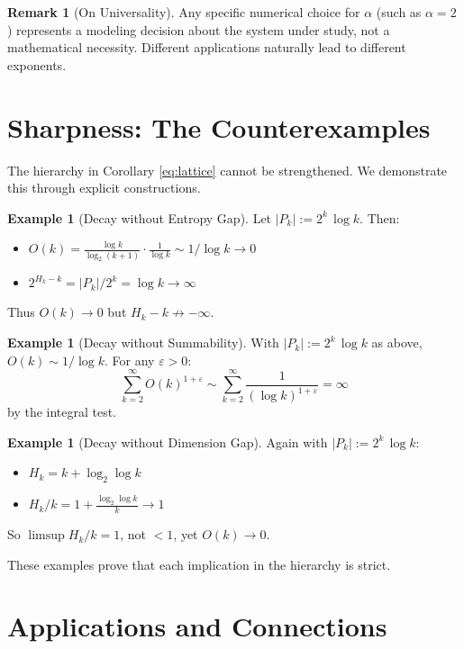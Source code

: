 \documentclass[11pt]{article}
\theoremstyle{definition}
\newtheorem{remark}[theorem]{Remark}
\newtheorem{example}[theorem]{Example}
\begin{document}
\begin{remark}[On Universality]
Any specific numerical choice for $\alpha$ (such as $\alpha=2$) represents a modeling decision about the system under study, not a mathematical necessity. Different applications naturally lead to different exponents.
\end{remark}

\section{Sharpness: The Counterexamples}

The hierarchy in Corollary \ref{eq:lattice} cannot be strengthened. We demonstrate this through explicit constructions.

\begin{example}[Decay without Entropy Gap]\label{ex:no-gap}
Let $|P_k|:=2^k\,\log k$. Then:
\begin{itemize}
\item $O(k)=\frac{\log k}{\log_2(k+1)}\cdot\frac{1}{\log k}\sim 1/\log k\to 0$
\item $2^{H_k-k}=|P_k|/2^k=\log k\to\infty$
\end{itemize}
Thus $O(k)\to 0$ but $H_k-k\not\to-\infty$.
\end{example}

\begin{example}[Decay without Summability]
With $|P_k|:=2^k\,\log k$ as above, $O(k)\sim 1/\log k$. For any $\varepsilon>0$:
$$\sum_{k=2}^{\infty} O(k)^{1+\varepsilon}\sim\sum_{k=2}^{\infty} \frac{1}{(\log k)^{1+\varepsilon}}=\infty$$
by the integral test.
\end{example}

\begin{example}[Decay without Dimension Gap]
Again with $|P_k|:=2^k\,\log k$:
\begin{itemize}
\item $H_k=k+\log_2\log k$
\item $H_k/k=1+\frac{\log_2\log k}{k}\to 1$
\end{itemize}
So $\limsup H_k/k=1$, not $<1$, yet $O(k)\to 0$.
\end{example}

These examples prove that each implication in the hierarchy is strict.

\section{Applications and Connections}
\end{document}
